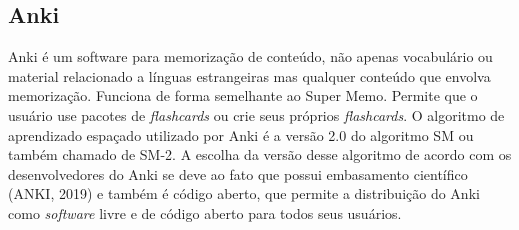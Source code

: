 
\subsection{Anki}
Anki é um software para memorização de conteúdo, não apenas vocabulário ou material relacionado a línguas estrangeiras mas qualquer conteúdo que envolva memorização. Funciona de forma semelhante ao Super Memo. Permite que o usuário use pacotes de \textit{flashcards} ou crie seus próprios \textit{flashcards}. O algoritmo de aprendizado espaçado utilizado por Anki é a versão 2.0 do algoritmo SM ou também chamado de SM-2. A escolha da versão desse algoritmo de acordo com os desenvolvedores do Anki se deve ao fato que possui embasamento científico (ANKI, 2019) e também é código aberto, que permite a distribuição do Anki como \textit{software} livre e de código aberto para todos seus usuários.



